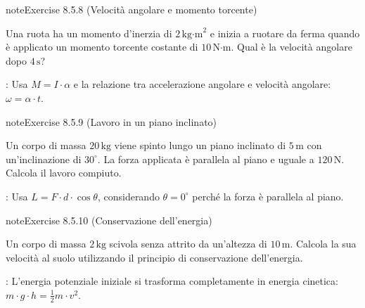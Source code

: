 \documentclass[letterpaper,10pt,italian]{jupyterBook}
\begin{document}
\begin{sphinxadmonition}{note}{Exercise 8.5.8 (Velocità angolare e momento torcente)}



\sphinxAtStartPar
Una ruota ha un momento d’inerzia di \(2 \, \text{kg·m}^2\) e inizia a ruotare da ferma quando è applicato un momento torcente costante di \(10 \, \text{N·m}\). Qual è la velocità angolare dopo \(4 \, \text{s}\)?

\sphinxAtStartPar
{}: Usa \( M = I \cdot \alpha \) e la relazione tra accelerazione angolare e velocità angolare: \( \omega = \alpha \cdot t \).
\end{sphinxadmonition}
 \label{exercise:ch/mechanics/actions-problems-exercise-8}

\begin{sphinxadmonition}{note}{Exercise 8.5.9 (Lavoro in un piano inclinato)}



\sphinxAtStartPar
Un corpo di massa \(20 \, \text{kg}\) viene spinto lungo un piano inclinato di \(5 \, \text{m}\) con un’inclinazione di \(30^\circ\). La forza applicata è parallela al piano e uguale a \(120 \, \text{N}\). Calcola il lavoro compiuto.

\sphinxAtStartPar
{}: Usa \( L = F \cdot d \cdot \cos\theta \), considerando \(\theta = 0^\circ\) perché la forza è parallela al piano.
\end{sphinxadmonition}
 \label{exercise:ch/mechanics/actions-problems-exercise-9}

\begin{sphinxadmonition}{note}{Exercise 8.5.10 (Conservazione dell’energia)}



\sphinxAtStartPar
Un corpo di massa \(2 \, \text{kg}\) scivola senza attrito da un’altezza di \(10 \, \text{m}\). Calcola la sua velocità al suolo utilizzando il principio di conservazione dell’energia.

\sphinxAtStartPar
{}: L’energia potenziale iniziale si trasforma completamente in energia cinetica: \( m \cdot g \cdot h = \frac{1}{2} m \cdot v^2 \).
\end{sphinxadmonition}

\sphinxstepscope
\end{document}
